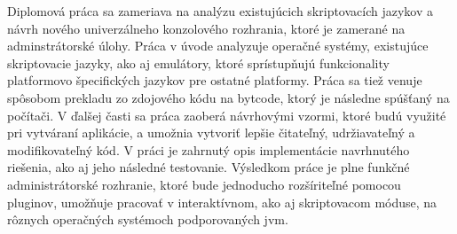 Diplomová práca sa zameriava na analýzu existujúcich skriptovacích jazykov a návrh nového univerzálneho konzolového rozhrania, ktoré je  zamerané na adminstrátorské úlohy. Práca v úvode analyzuje operačné systémy, existujúce skriptovacie jazyky, ako aj emulátory, ktoré sprístupňujú funkcionality platformovo špecifických jazykov pre ostatné platformy. Práca sa  tiež venuje spôsobom prekladu zo zdojového kódu na bytcode, ktorý je následne spúšťaný na počítači. V ďalšej časti sa práca zaoberá návrhovými vzormi, ktoré budú využité pri vytváraní aplikácie, a umožnia vytvoriť lepšie čitateľný, udržiavateľný a modifikovateľný kód. V práci je zahrnutý opis implementácie navrhnutého riešenia, ako aj jeho následné testovanie. Výsledkom práce je plne funkčné administrátorské rozhranie, ktoré bude jednoducho rozšíriteľné pomocou pluginov, umožňuje pracovať v interaktívnom, ako aj skriptovacom móduse, na rôznych operačných systémoch podporovaných \acrshort{jvm}. 

